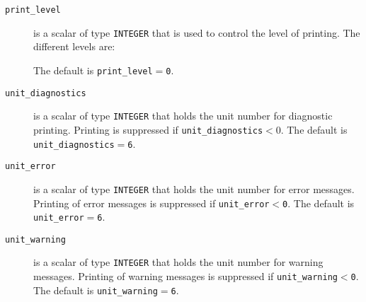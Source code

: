 \begin{description}

\item[\texttt{print\_level}] is a scalar of type  {\tt INTEGER}
that is used to control the level of printing. The different levels are:
The default is {\tt print\_level$=$\tt 0}.

\item[\texttt{unit\_diagnostics}] is a scalar  of type
{\tt INTEGER} that holds the
unit number for diagnostic printing. Printing is suppressed if
{\tt unit\_diagnostics$<0$}.
The default is {\tt unit\_diagnostics$=$6}.

\item[\texttt{unit\_error}] is a scalar of type  {\tt INTEGER} that holds the
unit number for error messages.
Printing of error messages
is suppressed if {\tt unit\_error$<$0}.
The default is {\tt unit\_error$=$6}.

\item[\texttt{unit\_warning}] is a scalar  of type  {\tt INTEGER} that holds the
unit number for warning messages.
Printing of warning messages is suppressed if {\tt unit\_warning$<$0}.
The default is {\tt unit\_warning$=$6}.

\end{description}




